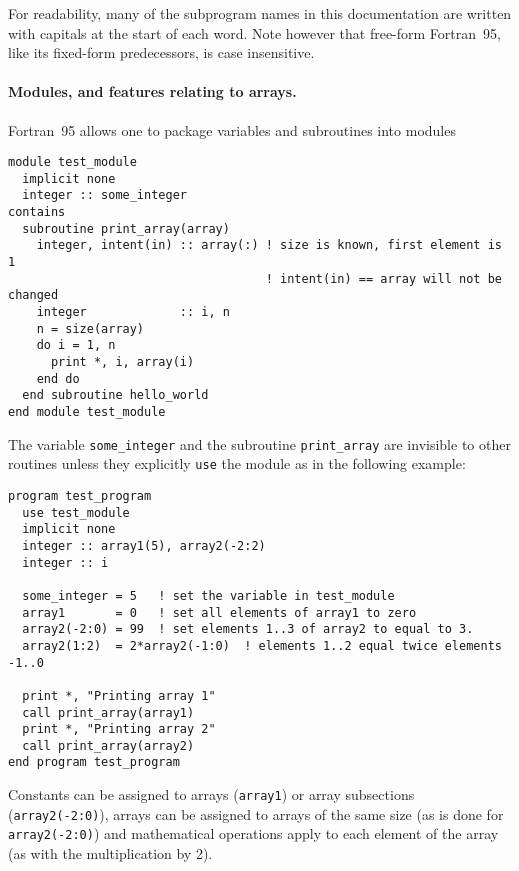 \documentclass[12pt]{article}
\begin{document}
For readability, many of the subprogram names in this documentation
are written with capitals at the start of each word. Note however that
free-form Fortran~95, like its fixed-form predecessors, is case
insensitive.

\paragraph{Modules, and features relating to arrays.} Fortran~95
allows one to package variables and subroutines into modules
\begin{lstlisting}
module test_module
  implicit none
  integer :: some_integer
contains
  subroutine print_array(array)
    integer, intent(in) :: array(:) ! size is known, first element is 1
                                    ! intent(in) == array will not be changed
    integer             :: i, n
    n = size(array)
    do i = 1, n
      print *, i, array(i)
    end do
  end subroutine hello_world
end module test_module
\end{lstlisting}
The variable \texttt{some\_integer} and the subroutine
\texttt{print\_array} are invisible to other routines unless they
explicitly \texttt{use} the module as in the following example:
\begin{lstlisting}
program test_program
  use test_module
  implicit none
  integer :: array1(5), array2(-2:2)
  integer :: i
  
  some_integer = 5   ! set the variable in test_module
  array1       = 0   ! set all elements of array1 to zero
  array2(-2:0) = 99  ! set elements 1..3 of array2 to equal to 3.
  array2(1:2)  = 2*array2(-1:0)  ! elements 1..2 equal twice elements -1..0

  print *, "Printing array 1"
  call print_array(array1)
  print *, "Printing array 2"
  call print_array(array2)
end program test_program
\end{lstlisting}
Constants can be assigned to arrays (\texttt{array1}) or array
subsections (\texttt{array2(-2:0)}), arrays can be assigned to arrays
of the same size (as is done for \texttt{array2(-2:0)}) and
mathematical operations apply to each element of the array (as with
the multiplication by 2).
\end{document}
